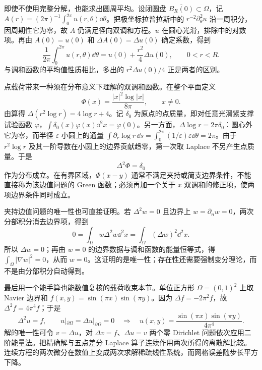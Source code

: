 即使不使用完整分解，也能求出圆周平均。设闭圆盘 $\overline{B_R(0)}\subset\Omega$，记 $A(r)=(2\pi)^{-1}\int_0^{2\pi}u(r,\theta)\dd\theta$。把极坐标拉普拉斯中的 $r^{-2}\partial_\theta^2u$ 沿一周积分，因周期性它为零，故 $A$ 仍满足径向双调和方程。$u$ 在圆心光滑，排除中的对数项。再由 $A(0)=u(0)$ 和 $\Delta A(0)=\Delta u(0)$ 确定系数，得到
\begin{equation}
\frac1{2\pi}\int_0^{2\pi}u(r,\theta)\dd\theta
=u(0)+\frac{r^2}{4}\Delta u(0),\qquad 0<r<R.
\label{eq:phys-cont-biharmonic-mean-value}
\end{equation}
与调和函数的平均值性质相比，多出的 $r^2\Delta u(0)/4$ 正是两者的区别。

点载荷带来一种须在分布意义下理解的双调和函数。在整个平面定义
\begin{equation}
\Phi(x)=\frac{|x|^2\log|x|}{8\pi},\qquad x\ne0.
\label{eq:phys-cont-biharmonic-fundamental}
\end{equation}
由算得 $\Delta(r^2\log r)=4\log r+4$。记 $\delta_0$ 为原点的点质量，即对任意光滑紧支撑试验函数 $\varphi$，$\int\delta_0(x)\varphi(x)\dd^2x=\varphi(0)$。另一方面，$\Delta\log r=2\pi\delta_0$：圆心外它为零，而半径 $\varepsilon$ 小圆上的通量 $\int\partial_r\log r\,\dd s=\int_0^{2\pi}(1/\varepsilon)\varepsilon\dd\theta=2\pi$。由于 $r^2\log r$ 及其一阶导数在小圆上的边界贡献趋零，第一次取 Laplace 不另产生点质量。于是
\begin{equation}
\Delta^2\Phi=\delta_0
\label{eq:phys-cont-biharmonic-fundamental-delta}
\end{equation}
作为分布成立。在有界区域，$\Phi(x-y)$ 通常不满足夹持或简支边界条件，不能直接称为该边值问题的 Green 函数；必须再加一个关于 $x$ 双调和的修正项，使两项边界条件同时成立。

夹持边值问题的唯一性也可直接证明。若 $\Delta^2w=0$ 且边界上 $w=\partial_nw=0$，两次分部积分消去边界项，得到
\[
0=\int_\Omega w\Delta^2w\dd^2x=\int_\Omega(\Delta w)^2\dd^2x.
\]
所以 $\Delta w=0$；再由 $w=0$ 的边界数据与调和函数的能量恒等式，得 $\int_\Omega|\nabla w|^2=0$，从而 $w=0$。这证明的是唯一性；存在性还需要强制变分理论，而不是由分部积分自动得到。

最后用一个能手算也能数值复核的载荷收束本节。单位正方形 $\Omega=(0,1)^2$ 上取 Navier 边界和 $f(x,y)=\sin(\pi x)\sin(\pi y)$。因为 $\Delta f=-2\pi^2f$，故 $\Delta^2f=4\pi^4f$；于是
\begin{equation}
\Delta^2u=f,\qquad u|_{\partial\Omega}=\Delta u|_{\partial\Omega}=0
\quad\Longrightarrow\quad
u(x,y)=\frac{\sin(\pi x)\sin(\pi y)}{4\pi^4}.
\label{eq:phys-cont-square-biharmonic-exact}
\end{equation}
解的唯一性可令 $v=\Delta u$，对 $\Delta v=f$、$\Delta u=v$ 两个零 Dirichlet 问题依次应用二阶能量法。把精确解与五点差分 Laplace 算子连续作用两次所得的离散解比较。连续方程的两次微分在数值上变成两次求解稀疏线性系统，而网格误差随步长平方下降。

